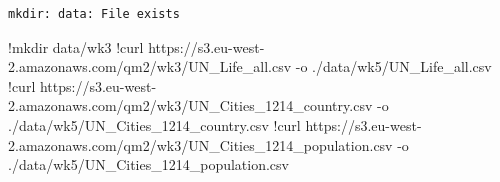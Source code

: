 \documentclass[
  letterpaper,
  DIV=11,
  numbers=noendperiod]{scrreprt}
\newenvironment{Shaded}{\begin{snugshade}}{\end{snugshade}}
\newcommand{\ErrorTok}[1]{\textcolor[rgb]{0.68,0.00,0.00}{#1}}
\newcommand{\FloatTok}[1]{\textcolor[rgb]{0.68,0.00,0.00}{#1}}
\newcommand{\NormalTok}[1]{\textcolor[rgb]{0.00,0.23,0.31}{#1}}
\newcommand{\OperatorTok}[1]{\textcolor[rgb]{0.37,0.37,0.37}{#1}}
\begin{document}
\begin{verbatim}
mkdir: data: File exists
\end{verbatim}

\begin{Shaded}
\begin{Highlighting}[]
\OperatorTok{!}\NormalTok{mkdir data}\OperatorTok{/}\NormalTok{wk3}
\OperatorTok{!}\NormalTok{curl https:}\OperatorTok{//}\NormalTok{s3.eu}\OperatorTok{{-}}\NormalTok{west}\OperatorTok{{-}}\FloatTok{2.}\ErrorTok{amazonaws}\NormalTok{.com}\OperatorTok{/}\NormalTok{qm2}\OperatorTok{/}\NormalTok{wk3}\OperatorTok{/}\NormalTok{UN\_Life\_all.csv }\OperatorTok{{-}}\NormalTok{o .}\OperatorTok{/}\NormalTok{data}\OperatorTok{/}\NormalTok{wk5}\OperatorTok{/}\NormalTok{UN\_Life\_all.csv}
\OperatorTok{!}\NormalTok{curl https:}\OperatorTok{//}\NormalTok{s3.eu}\OperatorTok{{-}}\NormalTok{west}\OperatorTok{{-}}\FloatTok{2.}\ErrorTok{amazonaws}\NormalTok{.com}\OperatorTok{/}\NormalTok{qm2}\OperatorTok{/}\NormalTok{wk3}\OperatorTok{/}\NormalTok{UN\_Cities\_1214\_country.csv }\OperatorTok{{-}}\NormalTok{o .}\OperatorTok{/}\NormalTok{data}\OperatorTok{/}\NormalTok{wk5}\OperatorTok{/}\NormalTok{UN\_Cities\_1214\_country.csv}
\OperatorTok{!}\NormalTok{curl https:}\OperatorTok{//}\NormalTok{s3.eu}\OperatorTok{{-}}\NormalTok{west}\OperatorTok{{-}}\FloatTok{2.}\ErrorTok{amazonaws}\NormalTok{.com}\OperatorTok{/}\NormalTok{qm2}\OperatorTok{/}\NormalTok{wk3}\OperatorTok{/}\NormalTok{UN\_Cities\_1214\_population.csv }\OperatorTok{{-}}\NormalTok{o .}\OperatorTok{/}\NormalTok{data}\OperatorTok{/}\NormalTok{wk5}\OperatorTok{/}\NormalTok{UN\_Cities\_1214\_population.csv}
\end{Highlighting}
\end{Shaded}
\end{document}
